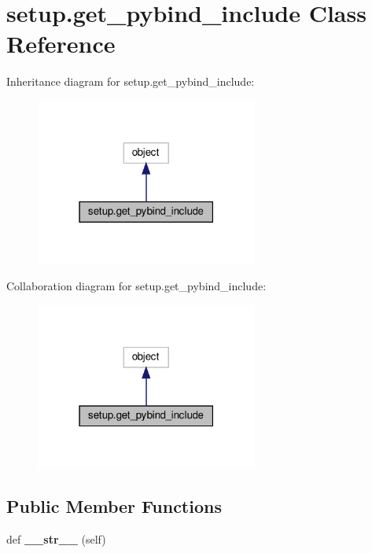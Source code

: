 \hypertarget{classsetup_1_1get__pybind__include}{}\section{setup.\+get\+\_\+pybind\+\_\+include Class Reference}
\label{classsetup_1_1get__pybind__include}


Inheritance diagram for setup.\+get\+\_\+pybind\+\_\+include\+:
\nopagebreak
\begin{figure}[H]
\begin{center}
\leavevmode
\includegraphics[width=207pt]{classsetup_1_1get__pybind__include__inherit__graph}
\end{center}
\end{figure}


Collaboration diagram for setup.\+get\+\_\+pybind\+\_\+include\+:
\nopagebreak
\begin{figure}[H]
\begin{center}
\leavevmode
\includegraphics[width=207pt]{classsetup_1_1get__pybind__include__coll__graph}
\end{center}
\end{figure}
\subsection*{Public Member Functions}
\begin{DoxyCompactItemize}
\item 
\mbox{\label{classsetup_1_1get__pybind__include_a18325cf8f6566c923226d9a145ba666d}} 
def {\bfseries \+\_\+\+\_\+str\+\_\+\+\_\+} (self)
\end{DoxyCompactItemize}


